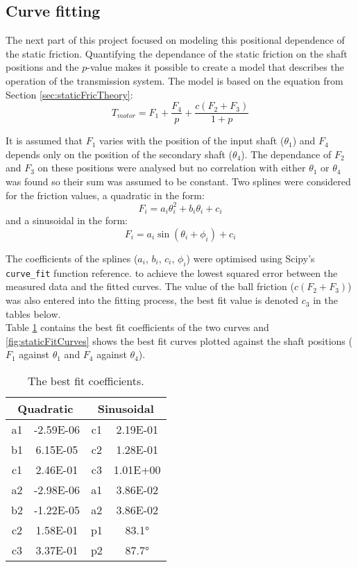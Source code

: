 \documentclass[12pt]{article}
\begin{document}
\subsection{Curve fitting}
The next part of this project focused on modeling this positional dependence of the static friction. Quantifying the dependance of the static friction on the shaft positions and the $p$-value makes it possible to create a model that describes the operation of the transmission system. The model is based on the equation from Section \ref{sec:staticFricTheory}:
$$T_{motor} = F_1 + \frac{F_4}{p} + \frac{c(F_2+F_3)}{1+p}$$

It is assumed that $F_1$ varies with the position of the input shaft ($\theta_1$) and $F_4$ depends only on the position of the secondary shaft ($\theta_4$). The dependance of $F_2$ and $F_3$ on these positions were analysed but no correlation with either $\theta_1$ or $\theta_4$ was found so their sum was assumed to be constant. Two splines were considered for the friction values, a quadratic in the form:
$$F_i = a_i \theta_i^2 + b_i \theta_i + c_i$$
and a sinusoidal in the form:
$$F_i = a_i \sin\left( \theta_i + \phi_i  \right)  + c_i$$

The coefficients of the splines ($a_i$, $b_i$, $c_i$, $\phi_i$) were optimised using Scipy's \verb|curve_fit| function \todo reference. to achieve the lowest squared error between the measured data and the fitted curves. The value of the ball friction ($c(F_2+F_3)$) was also entered into the fitting process, the best fit value is denoted $c_3$ in the tables below.\\

Table \ref{tab:staticFricCoeffs} contains the best fit coefficients of the two curves and \ref{fig:staticFitCurves} shows the best fit curves plotted against the shaft positions ($F_1$ against $\theta_1$ and $F_4$ against $\theta_4$).
 
\begin{table}[h]
    \centering
\begin{tabular}{|c|c|c|c|}
\hline
\multicolumn{2}{|c|}{Quadratic}     & \multicolumn{2}{|c|}{Sinusoidal}    \\ \hline
a1        & -2.59E-06 & c1         & 2.19E-01 \\ \hline
b1        & 6.15E-05  & c2         & 1.28E-01 \\ \hline
c1        & 2.46E-01  & c3         & 1.01E+00 \\ \hline
a2        & -2.98E-06 & a1         & 3.86E-02 \\ \hline
b2        & -1.22E-05 & a2         & 3.86E-02 \\ \hline
c2        & 1.58E-01  & p1         & 83.1°\\ \hline
c3        & 3.37E-01  & p2         & 87.7° \\ \hline
\end{tabular}
    \caption{The best fit coefficients.}
    \label{tab:staticFricCoeffs}
\end{table}
\end{document}
